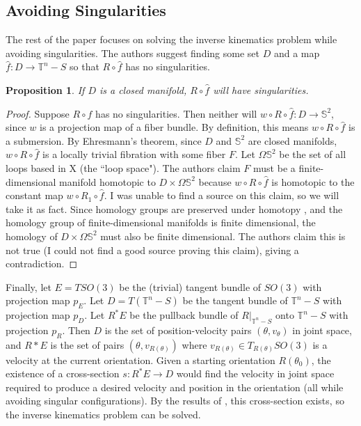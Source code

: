 \documentclass[12pt]{article}
\newtheorem{prop}{Proposition}
\theoremstyle{definition}
\begin{document}
\subsection{Avoiding Singularities}
The rest of the paper focuses on solving the inverse kinematics problem while
avoiding singularities. 
The authors suggest finding some set \(D\) and a map \(\hat{f} : D \rightarrow
\mathbb{T}^n - S\) so that \(R \circ \hat{f}\) has no singularities.

\begin{prop}
    If \(D\) is a closed manifold, \(R \circ \hat{f}\) will have singularities.
\end{prop}
\begin{proof}
    Suppose \(R \circ \hat{f}\) has no singularities. Then neither will 
    \(w \circ R \circ \hat{f} : D \rightarrow \mathbb{S}^2\), since \(w\) is a
    projection map of a fiber bundle. By definition, 
    this means \(w \circ R \circ \hat{f}\) is a submersion.
    By Ehresmann's theorem, since \(D\) and \(\mathbb{S}^2\) are closed
    manifolds, \(w \circ R \circ \hat{f}\) is a locally trivial fibration with
    some fiber \(F\).
    Let \(\Omega\mathbb{S}^2\) be the set of all loops based in X (the ``loop
    space").
    The authors claim \(F\) must be a finite-dimensional manifold homotopic to
    \(D \times \Omega\mathbb{S}^2\) because \(w \circ R \circ \hat{f}\) is
    homotopic to the constant map \(w \circ R_1 \circ \hat{f}\). I was unable to
    find a source on this claim, so we will take it as fact.
    Since homology groups are preserved under homotopy \cite{intro-top-manifolds}, and
    the homology group of finite-dimensional manifolds is finite dimensional, the
    homology of \(D \times \Omega\mathbb{S}^2\) must also be finite
    dimensional. The authors claim this is not true (I could not find
    a good source proving this claim), giving a contradiction.
\end{proof}

Finally, let \(E = TSO(3)\) be the (trivial) tangent
bundle of \(SO(3)\) with projection map \(p_E\). Let \(D = T(\mathbb{T}^n - S)\) be
the tangent bundle of \(\mathbb{T}^n - S\) with projection map \(p_D\).
Let \(R^*E\) be the pullback bundle of \(R|_{\mathbb{T}^n - S}\) onto
\(\mathbb{T}^n - S\) with projection \(p_R\). 
Then \(D\) is the set of position-velocity pairs
\((\theta, v_\theta)\) in joint space, and \(R*E\) is the set of pairs
\((\theta, v_{R(\theta)})\) where \(v_{R(\theta)} \in T_{R(\theta)}SO(3)\) 
is a velocity at the current orientation. 
Given a starting orientation \(R(\theta_0)\), the existence of a
cross-section \(s : R^*E \rightarrow D\) would find the velocity in joint space
required to produce a desired velocity and position in the orientation (all while
avoiding singular configurations). By the results of
\cite{robots-fiber-bundles}, this cross-section exists, so the inverse
kinematics problem can be solved.
\end{document}

